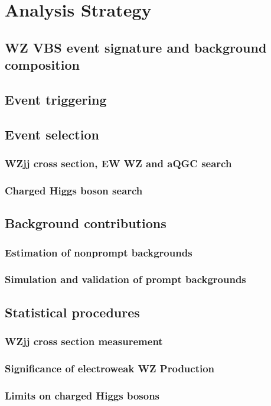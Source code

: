 \chapter{Analysis Strategy}

\section{WZ VBS event signature and background composition}
\section{Event triggering}
\section{Event selection}
\subsection{WZjj cross section, EW WZ and aQGC search}
\subsection{Charged Higgs boson search}
\section{Background contributions}
\subsection{Estimation of nonprompt backgrounds}
\subsection{Simulation and validation of prompt backgrounds}
\section{Statistical procedures}
\subsection{WZjj cross section measurement}
\subsection{Significance of electroweak WZ Production}
\subsection{Limits on charged Higgs bosons}
